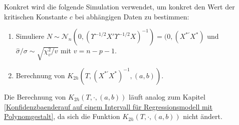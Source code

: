 \documentclass[12pt,a4paper]{article}
\theoremstyle{definition}
\theoremstyle{definition}
\theoremstyle{definition}
\theoremstyle{definition}
\begin{document}
Konkret wird die folgende Simulation verwendet, um konkret den Wert der kritischen Konstante $c$ bei abhängigen Daten zu bestimmen:

\begin{enumerate}
\item Simuliere $N \sim \mathscr{N}_{n}(0,(\Upsilon^{-1/2}X'\Upsilon^{-1/2}X)^{-1}) = (0,(X^{*'}X^{*})$ und $\hat{\sigma}/\sigma \sim \sqrt{\chi^2_v/v}$ mit $v=n-p-1$.
\item Berechnung von $K_{2h}(T,(X^{*'}X^{*})^{-1},(a,b))$.
\end{enumerate}

Die Berechnung von $K_{2h}(T,\cdot,(a,b))$ läuft analog zum Kapitel \ref{Konfidenzbaenderauf auf einem Intervall für Regressionsmodell mit Polynomgestalt}, da sich die Funktion $K_{2h}(T,\cdot,(a,b))$ nicht ändert.
\end{document}
